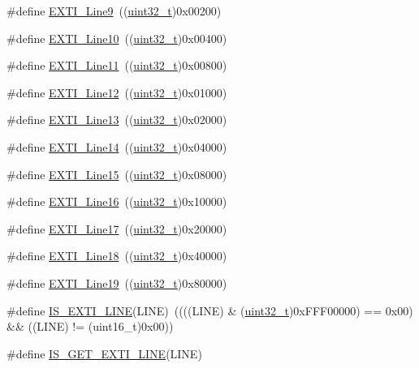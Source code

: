 \begin{DoxyCompactItemize}
\item 
\#define \hyperlink{group___e_x_t_i___lines_ga340ca6bb77b7a2d7747c78e7d3370360}{E\+X\+T\+I\+\_\+\+Line9}~((\hyperlink{_p_e___types_8h_a33594304e786b158f3fb30289278f5af}{uint32\+\_\+t})0x00200)
\item 
\#define \hyperlink{group___e_x_t_i___lines_gaefb90b266f5fc1571ed4606bbff1f1d7}{E\+X\+T\+I\+\_\+\+Line10}~((\hyperlink{_p_e___types_8h_a33594304e786b158f3fb30289278f5af}{uint32\+\_\+t})0x00400)
\item 
\#define \hyperlink{group___e_x_t_i___lines_ga6157b34c53e9b5cb8ee0d7ac3f5ba292}{E\+X\+T\+I\+\_\+\+Line11}~((\hyperlink{_p_e___types_8h_a33594304e786b158f3fb30289278f5af}{uint32\+\_\+t})0x00800)
\item 
\#define \hyperlink{group___e_x_t_i___lines_gab73a0a31f1814118955099b9dd3bdfef}{E\+X\+T\+I\+\_\+\+Line12}~((\hyperlink{_p_e___types_8h_a33594304e786b158f3fb30289278f5af}{uint32\+\_\+t})0x01000)
\item 
\#define \hyperlink{group___e_x_t_i___lines_gae382388ac34b78917a7bd06562e35c42}{E\+X\+T\+I\+\_\+\+Line13}~((\hyperlink{_p_e___types_8h_a33594304e786b158f3fb30289278f5af}{uint32\+\_\+t})0x02000)
\item 
\#define \hyperlink{group___e_x_t_i___lines_ga7b3821ad1b7a00b49c27075688f48101}{E\+X\+T\+I\+\_\+\+Line14}~((\hyperlink{_p_e___types_8h_a33594304e786b158f3fb30289278f5af}{uint32\+\_\+t})0x04000)
\item 
\#define \hyperlink{group___e_x_t_i___lines_gafc5ea85d1fc095a855fde8977a338c4c}{E\+X\+T\+I\+\_\+\+Line15}~((\hyperlink{_p_e___types_8h_a33594304e786b158f3fb30289278f5af}{uint32\+\_\+t})0x08000)
\item 
\#define \hyperlink{group___e_x_t_i___lines_ga21326db7db8ca614c746b7f52dc45ead}{E\+X\+T\+I\+\_\+\+Line16}~((\hyperlink{_p_e___types_8h_a33594304e786b158f3fb30289278f5af}{uint32\+\_\+t})0x10000)
\item 
\#define \hyperlink{group___e_x_t_i___lines_ga3e0fc18bc0722adc09605e3093b24c6a}{E\+X\+T\+I\+\_\+\+Line17}~((\hyperlink{_p_e___types_8h_a33594304e786b158f3fb30289278f5af}{uint32\+\_\+t})0x20000)
\item 
\#define \hyperlink{group___e_x_t_i___lines_ga6cdf346a3e7a3c8dbb036aca6741207c}{E\+X\+T\+I\+\_\+\+Line18}~((\hyperlink{_p_e___types_8h_a33594304e786b158f3fb30289278f5af}{uint32\+\_\+t})0x40000)
\item 
\#define \hyperlink{group___e_x_t_i___lines_ga49ac0744621f88d432d85838483ad1de}{E\+X\+T\+I\+\_\+\+Line19}~((\hyperlink{_p_e___types_8h_a33594304e786b158f3fb30289278f5af}{uint32\+\_\+t})0x80000)
\item 
\#define \hyperlink{group___e_x_t_i___lines_gaade8b8717a1d78f83d3cf180e2817557}{I\+S\+\_\+\+E\+X\+T\+I\+\_\+\+L\+I\+NE}(L\+I\+NE)~((((L\+I\+NE) \& (\hyperlink{_p_e___types_8h_a33594304e786b158f3fb30289278f5af}{uint32\+\_\+t})0x\+F\+F\+F00000) == 0x00) \&\& ((\+L\+I\+N\+E) != (uint16\+\_\+t)0x00))
\item 
\#define \hyperlink{group___e_x_t_i___lines_ga77c85c7b8426c6cfe91b4f5a2c58ecda}{I\+S\+\_\+\+G\+E\+T\+\_\+\+E\+X\+T\+I\+\_\+\+L\+I\+NE}(L\+I\+NE)
\end{DoxyCompactItemize}


